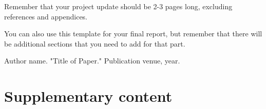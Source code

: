 \documentclass[conference]{IEEEtran}
\begin{document}
Remember that your project update should be 2-3 pages long, excluding references and appendices.

You can also use this template for your final report, but remember that there will be additional sections that you need to add for that part.

\begin{thebibliography}{9}

Author name. "Title of Paper." Publication venue, year.

\end{thebibliography}

\appendices
\section{Supplementary content}

\end{document}
